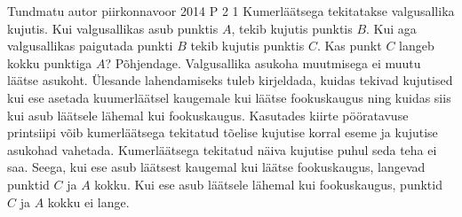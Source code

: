 {Tundmatu autor} %
{piirkonnavoor} %
{2014} %
{P 2} %
{1} %
{
\ifStatement
Kumerläätsega tekitatakse valgusallika kujutis. Kui valgusallikas asub punktis $A$, tekib kujutis punktis $B$. Kui aga valgusallikas paigutada punkti $B$ tekib kujutis punktis $C$. Kas punkt $C$ langeb kokku punktiga $A$? Põhjendage. Valgusallika asukoha muutmisega ei muutu läätse asukoht.
\fi
\ifHint
Ülesande lahendamiseks tuleb kirjeldada, kuidas tekivad kujutised kui ese asetada kuumerläätsel kaugemale kui läätse fookuskaugus ning kuidas siis kui asub läätsele lähemal kui fookuskaugus.
\fi
\ifSolution
Kasutades kiirte pööratavuse printsiipi võib kumerläätsega tekitatud tõelise kujutise korral eseme ja kujutise asukohad vahetada. Kumerläätsega tekitatud näiva kujutise puhul seda teha ei saa. Seega, kui ese asub läätsest kaugemal kui läätse fookuskaugus, langevad punktid $C$ ja $A$ kokku. Kui ese asub läätsele lähemal kui fookuskaugus, punktid $C$ ja $A$ kokku ei lange.
\fi
}
